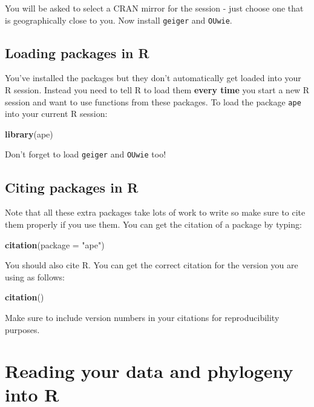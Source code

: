 \documentclass[11pt]{article}
\newcommand{\KeywordTok}[1]{\textcolor[rgb]{0.13,0.29,0.53}{\textbf{{#1}}}}
\newcommand{\StringTok}[1]{\textcolor[rgb]{0.31,0.60,0.02}{{#1}}}
\newcommand{\NormalTok}[1]{{#1}}
\begin{document}
You will be asked to select a CRAN mirror for the session - just choose one that is geographically close to you. Now install \texttt{geiger} and \texttt{OUwie}.

\subsection{Loading packages in R}
\label{loading}
You've installed the packages but they don't automatically get loaded
into your R session. Instead you need to tell R to load them \textbf{every
time} you start a new R session and want to use functions from these
packages. To load the package \texttt{ape} into your current R session:

\begin{snugshade}
\begin{Highlighting}[]
\KeywordTok{library}\NormalTok{(ape)}
\end{Highlighting}
\end{snugshade}

Don't forget to load \texttt{geiger} and \texttt{OUwie} too!

\subsection{Citing packages in R}\label{citing-packages}

Note that all these extra packages take lots of work to write so
make sure to cite them properly if you use them. You can get
the citation of a package by typing: 

\begin{snugshade}
\begin{Highlighting}[]
\KeywordTok{citation}\NormalTok{(package = }\StringTok{"ape"}\NormalTok{)}
\end{Highlighting}
\end{snugshade}

You should also cite R. You can get the correct citation for the version
you are using as follows:

\begin{snugshade}
\begin{Highlighting}[]
\KeywordTok{citation}\NormalTok{()}
\end{Highlighting}
\end{snugshade}

Make sure to include version numbers in your citations for reproducibility purposes.

\section{Reading your data and phylogeny into R}
\end{document}
